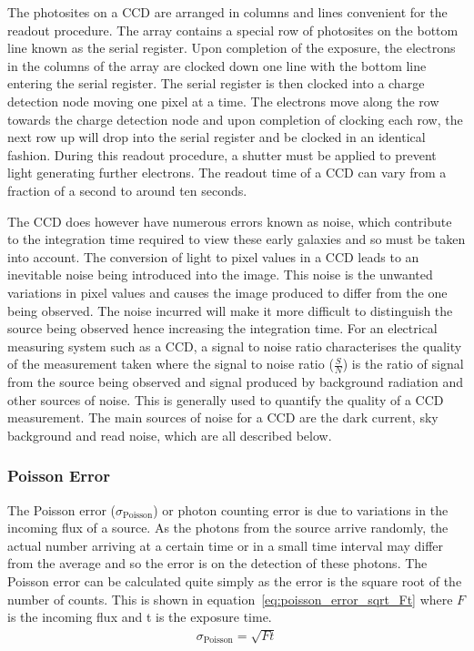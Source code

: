 		The photosites on a CCD are arranged in columns and lines convenient for the readout procedure. The array contains a special row of photosites on the bottom line known as the serial register. Upon completion of the exposure, the electrons in the columns of the array are clocked down one line with the bottom line entering the serial register. The serial register is then clocked into a charge detection node moving one pixel at a time. The electrons move along the row towards the charge detection node and upon completion of clocking each row, the next row up will drop into the serial register and be clocked in an identical fashion\cite{Astronomical_Image_Processing}. During this readout procedure, a shutter must be applied to prevent light generating further electrons. The readout time of a CCD can vary from a fraction of a second to around ten seconds.

		The CCD does however have numerous errors known as noise, which contribute to the integration time required to view these early galaxies and so must be taken into account. The conversion of light to pixel values in a CCD leads to an inevitable noise being introduced into the image. This noise is the unwanted variations in pixel values and causes the image produced to differ from the one being observed. The noise incurred will make it more difficult to distinguish the source being observed hence increasing the integration time. For an electrical measuring system such as a CCD, a signal to noise ratio characterises the quality of the measurement taken where the signal to noise ratio ($\frac{S}{N}$) is the ratio of signal from the source being observed and signal produced by background radiation and other sources of noise. This is generally used to quantify the quality of a CCD measurement. The main sources of noise for a CCD are the dark current, sky background and read noise, which are all described below.

		\subsubsection{Poisson Error} %
		\label{ssub:poisson_error}
			The Poisson error ($\sigma_\text{Poisson}$) or photon counting error is due to variations in the incoming flux of a source. As the photons from the source arrive randomly, the actual number arriving at a certain time or in a small time interval may differ from the average and so the error is on the detection of these photons. The Poisson error can be calculated quite simply as the error is the square root of the number of counts. This is shown in equation~\ref{eq:poisson_error_sqrt_Ft} where $F$ is the incoming flux and t is the exposure time.
			\begin{align}
				\sigma_\text{Poisson} = \sqrt{Ft} \label{eq:poisson_error_sqrt_Ft}
			\end{align}

